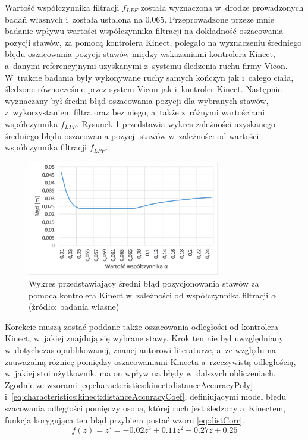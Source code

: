 Wartość współczynnika filtracji $f_{LPF}$ została wyznaczona w~drodze prowadzonych badań własnych i~została ustalona na $0.065$. Przeprowadzone przeze mnie badanie wpływu wartości współczynnika filtracji na dokładność oszacowania pozycji stawów, za pomocą kontrolera Kinect, polegało na wyznaczeniu średniego błędu oszacowania pozycji stawów między wskazaniami kontrolera Kinect, a~danymi referencyjnymi uzyskanymi z~systemu śledzenia ruchu firmy Vicon. W~trakcie badania były wykonywane ruchy samych kończyn jak i~całego ciała, śledzone równocześnie przez system Vicon jak i~kontroler Kinect. Następnie wyznaczany był średni błąd oszacowania pozycji dla wybranych stawów, z~wykorzystaniem filtra oraz bez niego, a~także z~różnymi wartościami współczynnika $f_{LPF}$. Rysunek \ref{fig:hybrid:kinect:lpf} przedstawia wykres zależności uzyskanego średniego błędu oszacowania pozycji stawów w~zależności od wartości współczynnika filtracji $f_{LPF}$. 
								
\begin{savenotes}
	\begin{figure}[!htb]
		\centering 
		\includegraphics[width=0.75\textwidth]{images/kinectPosErrorAlpha.png}
		\caption{Wykres przedstawiający średni błąd pozycjonowania stawów za pomocą kontrolera Kinect w~zależności od współczynnika filtracji $\alpha$ (źródło: badania własne)}
		\label{fig:hybrid:kinect:lpf}
	\end{figure}
\end{savenotes}
										
Korekcie muszą zostać poddane także oszacowania odległości od kontrolera Kinect, w~jakiej znajdują się wybrane stawy. Krok ten nie był uwzględniany w~dotychczas opublikowanej, znanej autorowi literaturze, a~ze względu na zauważalną różnicę pomiędzy oszacowaniami Kinecta a~rzeczywistą odległością, w~jakiej stoi użytkownik, ma on wpływ na błędy w~dalszych obliczeniach. Zgodnie ze wzorami \ref{eq:characteristics:kinect:distanceAccuracyPoly} i~\ref{eq:characteristics:kinect:distanceAccuracyCoef}, definiującymi model błędu szacowania odległości pomiędzy osobą, której ruch jest śledzony a~Kinectem, funkcja korygująca ten błąd przybiera postać wzoru \ref{eq:distCorr}.
\begin{equation}
	f(z) = z' = -0.02z^3 + 0.11z^2 - 0.27z + 0.25
	\label{eq:distCorr}
\end{equation}

